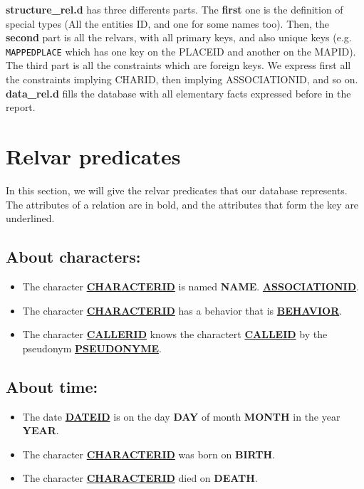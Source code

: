\documentclass[a4paper ,12pt,french]{article}
\begin{document}
\textbf{structure\_rel.d} has three differents parts. The \textbf{first} one is the definition of special types (All the entities ID, and one for some names too). Then, the \textbf{second} part is all the relvars, with all primary keys, and also unique keys (e.g. \texttt{MAPPEDPLACE} which has one key on the PLACEID and another on the MAPID). The third part is all the constraints which are foreign keys. We express first all the constraints implying CHARID, then implying ASSOCIATIONID, and so on.\\

\textbf{data\_rel.d} fills the database with all elementary facts expressed before in the report.

\section{Relvar predicates}
In this section, we will give the relvar predicates that our database represents. The attributes of a relation are in bold, and the attributes that form the key are underlined.

\subsection*{About characters:}
\begin{itemize}
\item The character \underline{\textbf{CHARACTERID}} is named \textbf{NAME}. \underline{\textbf{ASSOCIATIONID}}.
\item The character \underline{\textbf{CHARACTERID}} has a behavior that is \underline{\textbf{BEHAVIOR}}.
\item The character \underline{\textbf{CALLERID}} knows the charactert \underline{\textbf{CALLEID}} by the pseudonym \underline{\textbf{PSEUDONYME}}.
\end{itemize}

\subsection*{About time:}
\begin{itemize}
\item The date \underline{\textbf{DATEID}} is on the day \textbf{DAY} of month \textbf{MONTH} in the year \textbf{YEAR}.
\item The character \underline{\textbf{CHARACTERID}} was born on \textbf{BIRTH}.
\item The character \underline{\textbf{CHARACTERID}} died on \textbf{DEATH}.
\end{itemize}
\end{document}
